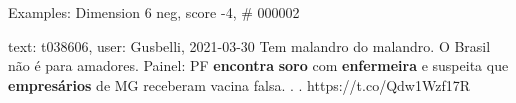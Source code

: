 \begin{frame}{Examples: Dimension 6 neg, score -4, \# 000002}
\footnotesize
\begin{alertblock}{text: t038606, user: Gusbelli, 2021-03-30}
Tem malandro do malandro. O Brasil não é para amadores. Painel: PF 
\textbf{encontra} \textbf{soro} com \textbf{enfermeira} e suspeita que 
\textbf{empresários} de MG receberam vacina falsa. . . https://t.co/Qdw1Wzf17R 
\end{alertblock}
\end{frame}
